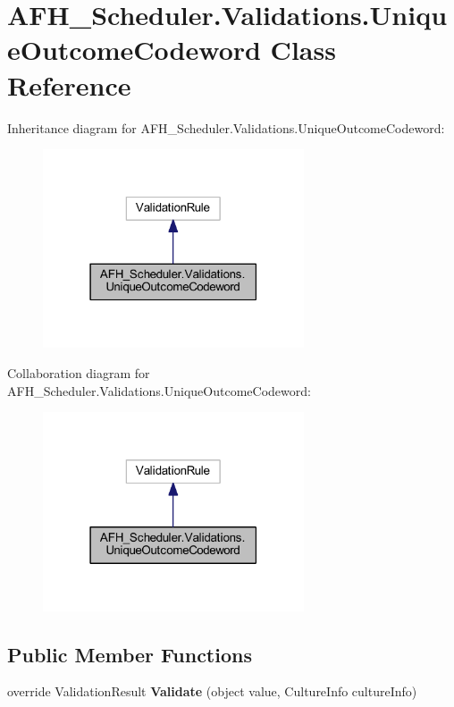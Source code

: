\section{A\+F\+H\+\_\+\+Scheduler.\+Validations.\+Unique\+Outcome\+Codeword Class Reference}
\label{class_a_f_h___scheduler_1_1_validations_1_1_unique_outcome_codeword}


Inheritance diagram for A\+F\+H\+\_\+\+Scheduler.\+Validations.\+Unique\+Outcome\+Codeword\+:
\nopagebreak
\begin{figure}[H]
\begin{center}
\leavevmode
\includegraphics[width=219pt]{class_a_f_h___scheduler_1_1_validations_1_1_unique_outcome_codeword__inherit__graph}
\end{center}
\end{figure}


Collaboration diagram for A\+F\+H\+\_\+\+Scheduler.\+Validations.\+Unique\+Outcome\+Codeword\+:
\nopagebreak
\begin{figure}[H]
\begin{center}
\leavevmode
\includegraphics[width=219pt]{class_a_f_h___scheduler_1_1_validations_1_1_unique_outcome_codeword__coll__graph}
\end{center}
\end{figure}
\subsection*{Public Member Functions}
\begin{DoxyCompactItemize}
\item 
override Validation\+Result \textbf{ Validate} (object value, Culture\+Info culture\+Info)
\end{DoxyCompactItemize}



